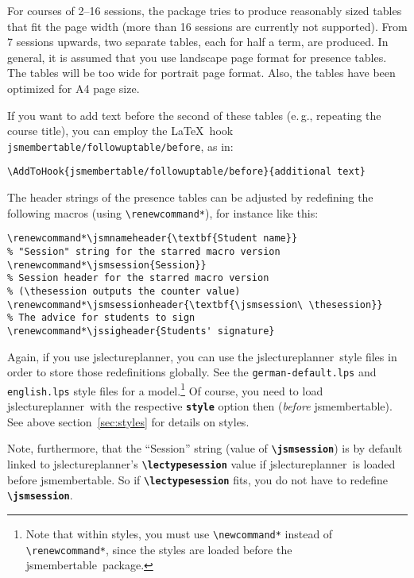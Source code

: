 \documentclass[english]{article}
\newcommand*\jmacro[1]{\textbf{\texttt{#1}}}
\newcommand*\jcsmacro[1]{\jmacro{\textbackslash{#1}}}
\newcommand*\joption[1]{\textbf{\texttt{#1}}}
\newcommand*\jfmacro[1]{\texttt{#1}}
\newcommand*\jfcsmacro[1]{\jfmacro{\textbackslash{#1}}}
\newcommand*\jslp{\textsf{jslectureplanner}}
\newcommand*\jsmt{\textsf{jsmembertable}}
\begin{document}
For courses of 2--16 sessions, the package tries to produce reasonably sized tables that
fit the page width (more than 16 sessions are currently not supported).
From 7 sessions upwards, two separate tables, each for half a term,
are produced. In general, it is assumed that you use landscape page format for presence tables.
The tables will be too wide for portrait page format. Also, the tables have been optimized for A4
page size.

If you want to add text before the second of these tables (e.\,g., repeating the course title),
you can employ the \LaTeX\ hook \texttt{jsmembertable/followuptable/before}, as in:
\begin{lstlisting}[language={[LaTeX]TeX},basicstyle={\small\ttfamily},frame=single,moretexcs={[1]{AddToHook}}]
\AddToHook{jsmembertable/followuptable/before}{additional text}
\end{lstlisting}
%
The header strings of the presence tables can be adjusted by redefining the following
macros (using \jfcsmacro{renewcommand*}), for instance like this:
\begin{lstlisting}[language={[LaTeX]TeX},basicstyle={\small\ttfamily},frame=single]
% Student Name
\renewcommand*\jsmnameheader{\textbf{Student name}}
% "Session" string for the starred macro version
\renewcommand*\jsmsession{Session}}
% Session header for the starred macro version
% (\thesession outputs the counter value)
\renewcommand*\jsmsessionheader{\textbf{\jsmsession\ \thesession}}
% The advice for students to sign
\renewcommand*\jssigheader{Students' signature}
\end{lstlisting}
Again, if you use \jslp, you can use the \jslp\
style files in order to store those redefinitions globally.
See the \texttt{german-default.lps} and \texttt{english.lps} style files for a model.\footnote{%
Note that within styles, you must use \jfcsmacro{newcommand*} instead of
\jfcsmacro{renewcommand*}, since the styles are loaded before the \jsmt\ package.}
Of course, you need to load \jslp\ with the respective \joption{style} option then
(\emph{before} \jsmt).
See above section~\ref{sec:styles} for details on styles.

Note, furthermore, that the ``Session'' string (value of \jcsmacro{jsmsession}) is by default
linked to \jslp's \jcsmacro{lectypesession} value if 
\jslp\ is loaded before \jsmt. So if \jcsmacro{lectypesession} fits, you do not have to redefine
\jcsmacro{jsmsession}.

\clearpage

\appendix
\end{document}
